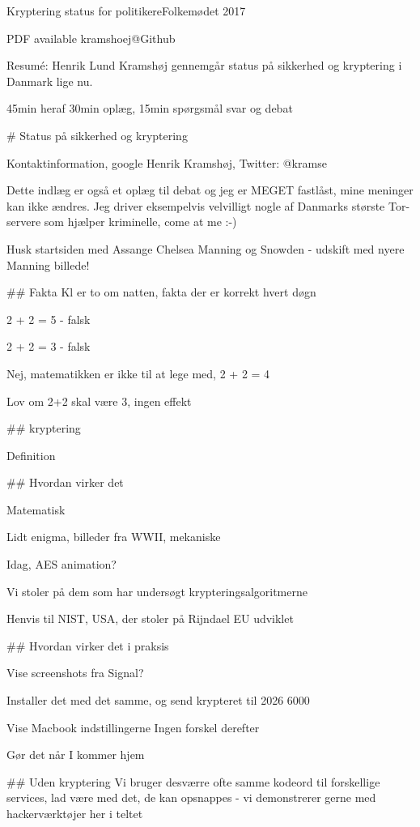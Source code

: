 \documentclass[20pt,landscape,a4paper,footrule]{foils}
\begin{document}

\mytitlepage
{Kryptering status for politikere}{Folkemødet 2017}

\centerline{\footnotesize
 PDF available kramshoej@Github}

\LogoOn

%

Resumé:
Henrik Lund Kramshøj gennemgår status på sikkerhed og kryptering i Danmark lige nu.

45min heraf 30min oplæg, 15min spørgsmål svar og debat


# Status på sikkerhed og kryptering

Kontaktinformation, google Henrik Kramshøj, Twitter: @kramse

Dette indlæg er også et oplæg til debat og jeg er MEGET fastlåst, mine meninger kan ikke ændres. Jeg driver eksempelvis velvilligt nogle af Danmarks største Tor-servere som hjælper kriminelle, come at me :-)

Husk startsiden med Assange Chelsea Manning og Snowden
- udskift med nyere Manning billede!

## Fakta
Kl er to om natten, fakta der er korrekt hvert døgn

2 + 2 = 5 - falsk

2 + 2 = 3 - falsk

Nej, matematikken er ikke til at lege med, 2 + 2 = 4

Lov om 2+2 skal være 3, ingen effekt


## kryptering

Definition

## Hvordan virker det

Matematisk

Lidt enigma, billeder fra WWII, mekaniske

Idag, AES animation?

\centerline{Vi stoler på dem som har undersøgt krypteringsalgoritmerne}

Henvis til NIST, USA, der stoler på Rijndael EU udviklet

## Hvordan virker det i praksis

Vise screenshots fra Signal?

\centerline{Installer det med det samme, og send krypteret til 2026 6000}

Vise Macbook indstillingerne
Ingen forskel derefter

\centerline{Gør det når I kommer hjem}

## Uden kryptering
Vi bruger desværre ofte samme kodeord til forskellige services, lad være med det, de kan opsnappes - vi demonstrerer gerne med hackerværktøjer her i teltet
\end{document}
